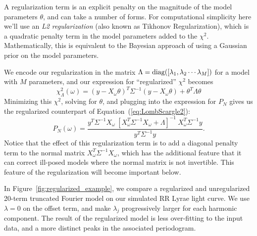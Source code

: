 \documentclass[12pt,preprint]{aastex}
\newcommand{\Fig}[1]{Figure~\ref{fig:#1}}
\newcommand{\fig}[1]{\Fig{#1}}
\newcommand{\Eq}[1]{Equation~(\ref{eq:#1})}
\newcommand{\eq}[1]{\Eq{#1}}
\newcommand{\eqlabel}[1]{\label{eq:#1}}
\begin{document}
A regularization term is an explicit penalty on the magnitude of the model parameters $\theta$, and can take a number of forms. For computational simplicity here we'll use an {\it L2 regularization} (also known as Tikhonov Regularization), which is a quadratic penalty term in the model parameters added to the $\chi^2$. Mathematically, this is equivalent to the Bayesian approach of using a Gaussian prior on the model parameters.

We encode our regularization in the matrix $\Lambda = {\rm diag}([\lambda_1, \lambda_2 \cdots \lambda_M])$ for a model with $M$ parameters, and our expression for ``regularized'' $\chi^2$ becomes
\begin{equation}
  \eqlabel{chi2reg}
  \chi_\Lambda^2(\omega) = (y - X_\omega\theta)^T\Sigma^{-1}(y - X_\omega\theta) + \theta^T\Lambda\theta
\end{equation}
Minimizing this $\chi^2$, solving for $\theta$, and plugging into the expression for $P_N$ gives us the regularized counterpart of \eq{LombScargle2}:
\begin{equation}
  \eqlabel{LombScargleReg}
  P_N(\omega) = \frac{y^T\Sigma^{-1}X_\omega~[X_\omega^T\Sigma^{-1}X_\omega + \Lambda]^{-1}~X_\omega^T\Sigma^{-1}y}{y^T\Sigma^{-1}y}.
\end{equation}
Notice that the effect of this regularization term is to add a diagonal penalty term to the normal matrix $X_\omega^T\Sigma^{-1}X_\omega$, which has the additional feature that it can correct ill-posed models where the normal matrix is not invertible. This feature of the regularization will become important below.

In \fig{regularized_example}, we compare a regularized and unregularized 20-term truncated Fourier model on our simulated RR Lyrae light curve. We use $\lambda = 0$ on the offset term, and make $\lambda_j$ progressively larger for each harmonic component. The result of the regularized model is less over-fitting to the input data, and a more distinct peaks in the associated periodogram.
\end{document}
